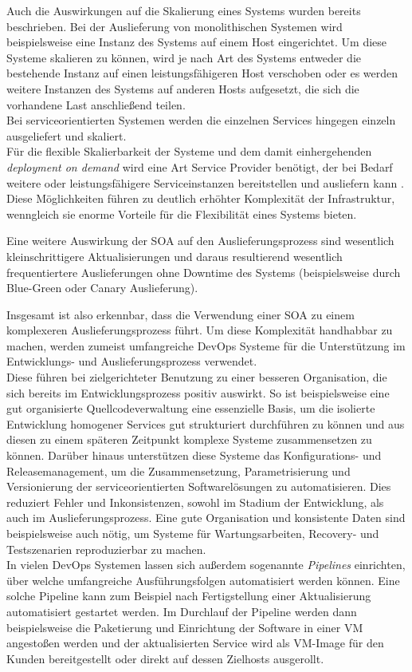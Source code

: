Auch die Auswirkungen auf die Skalierung eines Systems wurden bereits beschrieben. Bei der Auslieferung von monolithischen Systemen wird beispielsweise eine Instanz des Systems auf einem Host eingerichtet. Um diese Systeme skalieren zu können, wird je nach Art des Systems entweder die bestehende Instanz auf einen leistungsfähigeren Host verschoben oder es werden weitere Instanzen des Systems auf anderen Hosts aufgesetzt, die sich die vorhandene Last anschließend teilen.\\
Bei serviceorientierten Systemen werden die einzelnen Services hingegen einzeln ausgeliefert und skaliert.\\
Für die flexible Skalierbarkeit der Systeme und dem damit einhergehenden \textit{deployment on demand} wird eine Art Service Provider benötigt, der bei Bedarf weitere oder leistungsfähigere Serviceinstanzen bereitstellen und ausliefern kann \cite{NADAREISHVILI.2016}. Diese Möglichkeiten führen zu deutlich erhöhter Komplexität der Infrastruktur, wenngleich sie enorme Vorteile für die Flexibilität eines Systems bieten.

Eine weitere Auswirkung der SOA auf den Auslieferungsprozess sind wesentlich kleinschrittigere Aktualisierungen und daraus resultierend wesentlich frequentiertere Auslieferungen ohne Downtime des Systems (beispielsweise durch Blue-Green oder Canary Auslieferung).

Insgesamt ist also erkennbar, dass die Verwendung einer SOA zu einem komplexeren Auslieferungsprozess führt. Um diese Komplexität handhabbar zu machen, werden zumeist umfangreiche DevOps Systeme für die Unterstützung im Entwicklungs- und Auslieferungsprozess verwendet.\\
Diese führen bei zielgerichteter Benutzung zu einer besseren Organisation, die sich bereits im Entwicklungsprozess positiv auswirkt. So ist beispielsweise eine gut organisierte Quellcodeverwaltung eine essenzielle Basis, um die isolierte Entwicklung homogener Services gut strukturiert durchführen zu können und aus diesen zu einem späteren Zeitpunkt komplexe Systeme zusammensetzen zu können. Darüber hinaus unterstützen diese Systeme das Konfigurations- und Releasemanagement, um die Zusammensetzung, Parametrisierung und Versionierung der serviceorientierten Softwarelösungen zu automatisieren. Dies reduziert Fehler und Inkonsistenzen, sowohl im Stadium der Entwicklung, als auch im Auslieferungsprozess. Eine gute Organisation und konsistente Daten sind beispielsweise auch nötig, um Systeme für Wartungsarbeiten, Recovery- und Testszenarien reproduzierbar zu machen.\\
In vielen DevOps Systemen lassen sich außerdem sogenannte \textit{Pipelines} einrichten, über welche umfangreiche Ausführungsfolgen automatisiert werden können. Eine solche Pipeline kann zum Beispiel nach Fertigstellung einer Aktualisierung automatisiert gestartet werden. Im Durchlauf der Pipeline werden dann beispielsweise die Paketierung und Einrichtung der Software in einer VM angestoßen werden und der aktualisierten Service wird als VM-Image für den Kunden bereitgestellt oder direkt auf dessen Zielhosts ausgerollt.

